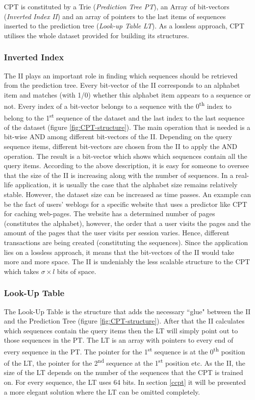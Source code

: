 CPT is constituted by a Trie (\emph{Prediction Tree PT}), an Array of bit-vectors (\emph{Inverted Index II}) and an array of pointers to the last items of sequences inserted to the prediction tree (\emph{Look-up Table LT}). As a lossless approach, CPT utilises the whole dataset provided for building its structures.

\subsubsection*{Inverted Index}
The II plays an important role in finding which sequences should be retrieved from the prediction tree. Every bit-vector of the II corresponds to an alphabet item and matches (with 1/0) whether this alphabet item appears to a sequence or not. Every index of a bit-vector belongs to a sequence with the 0\textsuperscript{th} index to belong to the 1\textsuperscript{st} sequence of the dataset and the last index to the last sequence of the dataset (figure \ref{fig:CPT-structure}). The main operation that is needed is a bit-wise AND among different bit-vectors of the II. Depending on the query sequence items, different bit-vectors are chosen from the II to apply the AND operation. The result is a bit-vector which shows which sequences contain all the query items. According to the above description, it is easy for someone to oversee that the size of the II is increasing along with the number of sequences. In a real-life application, it is usually the case that the alphabet size remains relatively stable. However, the dataset size can be increased as time passes. An example can be the fact of users' weblogs for a specific website that uses a predictor like CPT for caching web-pages. The website has a determined number of pages (constitutes the alphabet), however, the order that a user visits the pages and the amount of the pages that the user visits per session varies. Hence, different transactions are being created (constituting the sequences). Since the application lies on a lossless approach, it means that the bit-vectors of the II would take more and more space. The II is undeniably the less scalable structure to the CPT which takes \(\sigma \times l\) bits of space.

\subsubsection*{Look-Up Table}
The Look-Up Table is the structure that adds the necessary ``glue" between the II and the Prediction Tree (figure \ref{fig:CPT-structure}). After that the II calculates which sequences contain the query items then the LT will simply point out to those sequences in the PT. The LT is an array with pointers to every end of every sequence in the PT. The pointer for the 1\textsuperscript{st} sequence is at the 0\textsuperscript{th} position of the LT, the pointer for the 2\textsuperscript{nd} sequence at the 1\textsuperscript{st} position etc. As the II, the size of the LT depends on the number of the sequences that the CPT is trained on. For every sequence, the LT uses 64 bits. In section \ref{ccpt} it will be presented a more elegant solution where the LT can be omitted completely.

